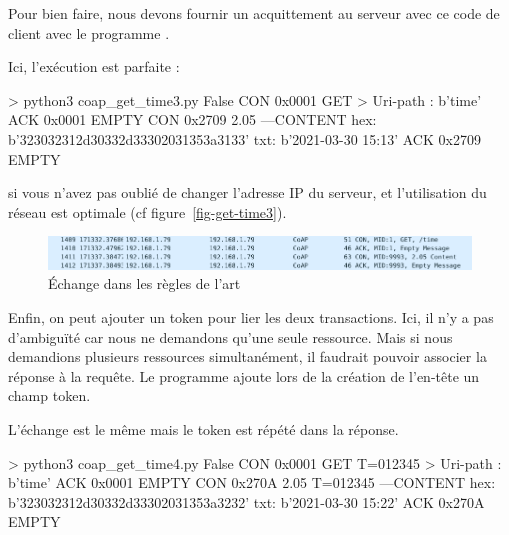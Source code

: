          \vspace{1em}

Pour bien faire, nous devons fournir un acquittement au serveur avec ce code de client avec le programme .


Ici, l'exécution est parfaite :

\begin{termc}[backgroundcolor=\color{gray!10}, basicstyle=\ttfamily\small, escapechar=@] 
> python3 coap_get_time3.py
False
CON  0x0001 GET   
> Uri-path : b'time'
ACK  0x0001 EMPTY 
CON  0x2709 2.05  
---CONTENT
hex: b'323032312d30332d33302031353a3133'
txt: b'2021-03-30 15:13'
ACK  0x2709 EMPTY 
\end{termc}

\noindent si vous n'avez pas oublié de changer l'adresse IP du serveur, et l'utilisation du réseau est optimale (cf figure~\vref{fig-get-time3}).

\begin{figure}[tbp]
\centerline{\includegraphics[width=1\columnwidth]{Pictures/get-time3.png}}
\caption{Échange dans les règles de l'art}
\label{fig-get-time3}
\end{figure}

Enfin, on peut ajouter un token pour lier les deux transactions. Ici, il n'y a pas d’ambiguïté car nous ne demandons qu'une seule ressource. Mais si nous demandions plusieurs ressources simultanément, il faudrait pouvoir associer la réponse à la requête. Le programme  ajoute lors de la création de l'en-tête un champ token.


L'échange est le même mais le token est répété dans la réponse.

\begin{termc}[backgroundcolor=\color{gray!10}, basicstyle=\ttfamily\small, escapechar=@] 
> python3 coap_get_time4.py
False
CON  0x0001 GET   T=012345
> Uri-path : b'time'
ACK  0x0001 EMPTY 
CON  0x270A 2.05  T=012345
---CONTENT
hex: b'323032312d30332d33302031353a3232'
txt: b'2021-03-30 15:22'
ACK  0x270A EMPTY 
\end{termc}

